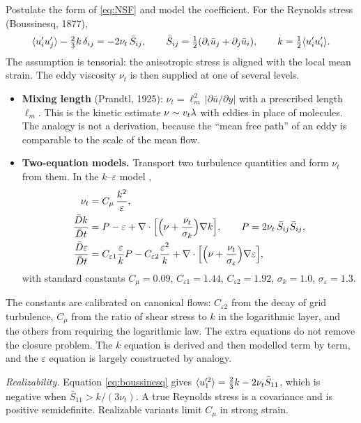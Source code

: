 Postulate the form of \eqref{eq:NSF} and model the coefficient. For the
Reynolds stress (Boussinesq, 1877),
\begin{equation}
  \langle u_i'u_j' \rangle-\tfrac23k\,\delta_{ij}=-2\nu_t\,\bar S_{ij},
  \qquad
  \bar S_{ij}=\tfrac12(\partial_i\bar u_j+\partial_j\bar u_i),
  \qquad k=\tfrac12\langle u_i'u_i' \rangle .
  \label{eq:boussinesq}
\end{equation}
The assumption is tensorial: the anisotropic stress is aligned with the
local mean strain. The eddy viscosity $\nu_t$ is then supplied at one of
several levels.
\begin{itemize}
  \item \textbf{Mixing length} (Prandtl, 1925):
    $\nu_t=\ell_m^2\,|\partial\bar u/\partial y|$ with a prescribed length
    $\ell_m$. This is the kinetic estimate $\nu\sim v_t\lambda$ with eddies
    in place of molecules. The analogy is not a derivation, because the
    ``mean free path'' of an eddy is comparable to the scale of the mean
    flow.
  \item \textbf{Two-equation models.} Transport two turbulence quantities
    and form $\nu_t$ from them. In the $k$--$\varepsilon$ model
    \cite{LaunderSpalding74},
    \begin{align}
      \nu_t &= C_\mu\,\frac{k^2}{\varepsilon}, \nonumber\\
      \frac{\bar Dk}{\bar Dt} &= P-\varepsilon
         +\nabla\cdot\Bigl[\Bigl(\nu+\frac{\nu_t}{\sigma_k}\Bigr)\nabla k\Bigr],
         \qquad P=2\nu_t\,\bar S_{ij}\bar S_{ij}, \\
      \frac{\bar D\varepsilon}{\bar Dt} &= C_{\varepsilon1}\frac{\varepsilon}{k}P
         -C_{\varepsilon2}\frac{\varepsilon^2}{k}
         +\nabla\cdot\Bigl[\Bigl(\nu+\frac{\nu_t}{\sigma_\varepsilon}\Bigr)
           \nabla\varepsilon\Bigr], \nonumber
    \end{align}
    with standard constants $C_\mu=0.09$, $C_{\varepsilon1}=1.44$,
    $C_{\varepsilon2}=1.92$, $\sigma_k=1.0$, $\sigma_\varepsilon=1.3$.
\end{itemize}
The constants are calibrated on canonical flows: $C_{\varepsilon2}$ from
the decay of grid turbulence, $C_\mu$ from the ratio of shear stress to $k$
in the logarithmic layer, and the others from requiring the logarithmic
law. The extra equations do not remove the closure problem. The $k$
equation is derived and then modelled term by term, and the $\varepsilon$
equation is largely constructed by analogy.

\emph{Realizability.} Equation \eqref{eq:boussinesq} gives
$\langle u_1'^2 \rangle=\tfrac23k-2\nu_t\bar S_{11}$, which is negative when
$\bar S_{11}>k/(3\nu_t)$. A true Reynolds stress is a covariance and is
positive semidefinite. Realizable variants limit $C_\mu$ in strong strain.

